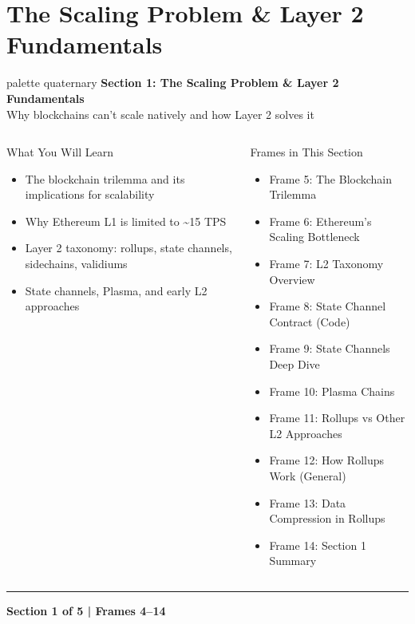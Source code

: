 \documentclass[8pt,aspectratio=169]{beamer}
\newcommand{\bottomnote}[1]{\vfill\vspace{-2mm}\textcolor{mllavender2}{\rule{\textwidth}{0.4pt}}\vspace{1mm}\footnotesize\textbf{#1}}
\begin{document}
\section{The Scaling Problem \& Layer 2 Fundamentals}

\begin{frame}{}
\begin{beamercolorbox}[sep=12pt,center,rounded=true,shadow=true]{palette quaternary}
  {\Large\bfseries Section 1: The Scaling Problem \& Layer 2 Fundamentals}\\[6pt]
  {\normalsize Why blockchains can't scale natively and how Layer 2 solves it}
\end{beamercolorbox}
\vspace{4mm}
\begin{columns}[T]
\begin{block}{What You Will Learn}
\footnotesize
\begin{itemize}
  \item The blockchain trilemma and its implications for scalability
  \item Why Ethereum L1 is limited to \textasciitilde15 TPS
  \item Layer 2 taxonomy: rollups, state channels, sidechains, validiums
  \item State channels, Plasma, and early L2 approaches
\end{itemize}
\end{block}
\begin{block}{Frames in This Section}
\footnotesize
\begin{itemize}
  \item Frame 5: The Blockchain Trilemma
  \item Frame 6: Ethereum's Scaling Bottleneck
  \item Frame 7: L2 Taxonomy Overview
  \item Frame 8: State Channel Contract (Code)
  \item Frame 9: State Channels Deep Dive
  \item Frame 10: Plasma Chains
  \item Frame 11: Rollups vs Other L2 Approaches
  \item Frame 12: How Rollups Work (General)
  \item Frame 13: Data Compression in Rollups
  \item Frame 14: Section 1 Summary
\end{itemize}
\end{block}
\end{columns}
\bottomnote{Section 1 of 5 | Frames 4--14}
\end{frame}
\end{document}
